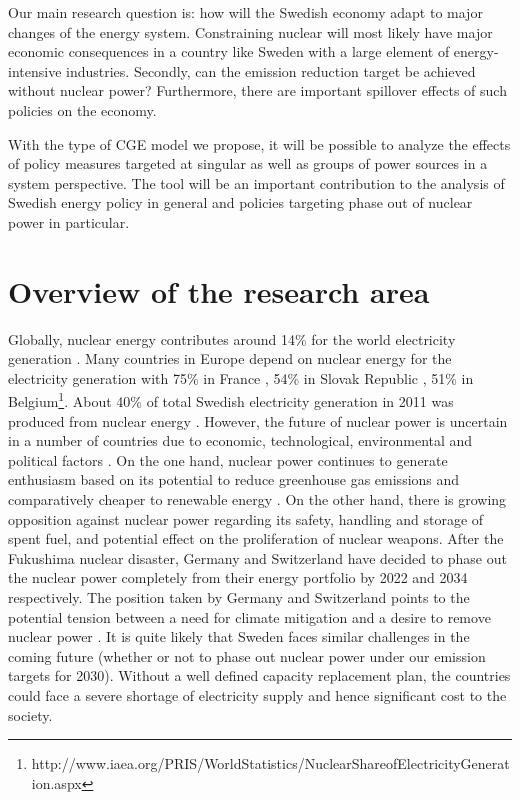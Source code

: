 Our main research question is: how will the Swedish economy adapt to major changes of the energy system. Constraining nuclear will most likely have major economic consequences in a country like Sweden with a large element of energy-intensive industries. Secondly, can the emission reduction target be achieved without nuclear power? Furthermore, there are important spillover effects of such policies on the economy.

With the type of CGE model we propose, it will be possible to analyze the effects of policy measures targeted at singular as well as groups of power sources in a system perspective. The tool will be an important contribution to the analysis of Swedish energy policy in general and policies targeting phase out of nuclear power in particular.

\section{Overview of the research area}
Globally, nuclear energy contributes around 14\% for the world electricity generation \citep{OECD2012}. Many countries in Europe depend on nuclear energy for the electricity generation with 75\% in France , 54\% in Slovak Republic , 51\% in Belgium\footnote{http://www.iaea.org/PRIS/WorldStatistics/NuclearShareofElectricityGeneration.aspx}. About 40\% of total Swedish electricity generation in 2011 was produced from nuclear energy \citep{SEA2012}. However, the future of nuclear power is uncertain in a number of countries due to economic, technological, environmental and political factors \citep{Joskow2012}. On the one hand, nuclear power continues to generate enthusiasm based on its potential to reduce greenhouse gas emissions and comparatively cheaper to renewable energy \citep{Davis2012, Renssen2013}. On the other hand, there is growing opposition against nuclear power regarding its safety, handling and storage of spent fuel, and potential effect on the proliferation of nuclear weapons. After the Fukushima nuclear disaster, Germany and Switzerland have decided to phase out the nuclear power completely from their energy portfolio by  2022 and 2034 respectively. The position taken by Germany and Switzerland points to the potential tension between a need for climate mitigation and a desire to remove nuclear power \citep{Glomsrod2013}. It is quite likely that Sweden faces similar challenges in the coming future (whether or not to phase out nuclear power under our emission targets for 2030). Without a well defined capacity replacement plan, the countries could face a severe shortage of electricity supply and hence significant cost to the society.

